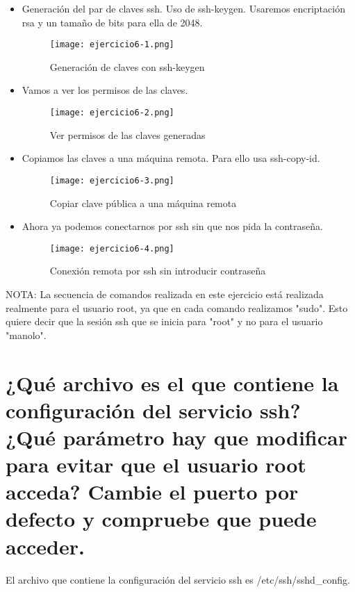 	\begin{itemize}
		\item Generación del par de claves ssh. Uso de ssh-keygen. Usaremos encriptación rsa y un tamaño de bits para ella de 2048.
			\begin{figure}[H] 
				\centering
				\texttt{[image: ejercicio6-1.png]} 
				\label{figura52} 
				\caption{Generación de claves con ssh-keygen}
			\end{figure}
		\item Vamos a ver los permisos de las claves.
			\begin{figure}[H]	
				\centering
				\texttt{[image: ejercicio6-2.png]} 
				\label{figura53} 
				\caption{Ver permisos de las claves generadas}
			\end{figure}
		\item Copiamos las claves a una máquina remota. Para ello usa ssh-copy-id.
			\begin{figure}[H]	
				\centering
				\texttt{[image: ejercicio6-3.png]} 
				\label{figura54} 
				\caption{Copiar clave pública a una máquina remota}
			\end{figure}
		\item Ahora ya podemos conectarnos por ssh sin que nos pida la contraseña.
			\begin{figure}[H]	
				\centering
				\texttt{[image: ejercicio6-4.png]} 
				\label{figura55} 
				\caption{Conexión remota por ssh sin introducir contraseña}
			\end{figure}
	\end{itemize}
	
	
	NOTA: La secuencia de comandos realizada en este ejercicio está realizada realmente para el usuario root, ya que en cada comando realizamos "sudo". Esto quiere decir que la sesión ssh que se inicia para "root" y no para el usuario "manolo".
	\section{¿Qué archivo es el que contiene la configuración del servicio ssh? ¿Qué parámetro hay que modificar para evitar que el usuario root acceda? Cambie el puerto por defecto y compruebe que puede acceder.}
	
	El archivo que contiene la configuración del servicio ssh es /etc/ssh/sshd\_config\cite{ejercicio7-1}.
	\\
	
